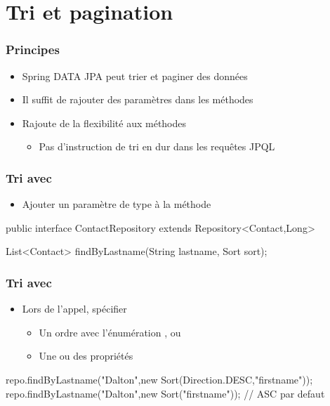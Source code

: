 \section{Tri et pagination}



\begin{frame}
 \frametitle{Principes}
 \begin{itemize}
  \item Spring DATA JPA peut trier et paginer des données
  \item Il suffit de rajouter des paramètres dans les méthodes
  \item Rajoute de la flexibilité aux méthodes
  \begin{itemize}
   \item Pas d'instruction de tri en dur dans les requêtes JPQL
  \end{itemize}
 \end{itemize}

\end{frame}

\begin{frame}[fragile]
 \frametitle{Tri avec }
 \begin{itemize}
  \item Ajouter un paramètre de type  à la méthode
 \end{itemize}
 \begin{javacode}
public interface ContactRepository extends Repository<Contact,Long> {

  List<Contact> findByLastname(String lastname, Sort sort);

}
 \end{javacode}
\end{frame}

\begin{frame}[fragile]
 \frametitle{Tri avec }
 \begin{itemize}
  \item Lors de l'appel, spécifier
  \begin{itemize}
   \item Un ordre avec l'énumération ,  ou 
   \item Une ou des propriétés
  \end{itemize}
 \end{itemize}
 \begin{javacode}
repo.findByLastname("Dalton",new Sort(Direction.DESC,"firstname"));
repo.findByLastname("Dalton",new Sort("firstname")); // ASC par defaut
 \end{javacode}
\end{frame}

